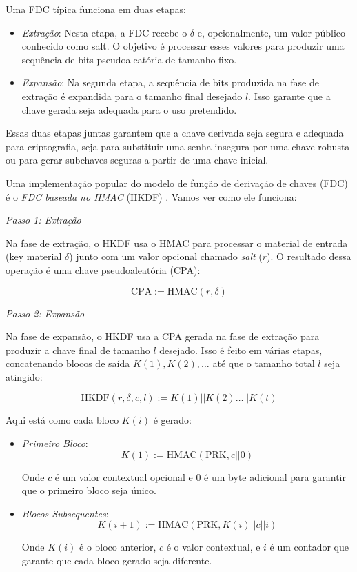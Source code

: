 Uma FDC típica funciona em duas etapas:
\begin{itemize}
\item[] {\em Extração}:
  Nesta etapa, a FDC recebe o $\delta$ e, opcionalmente, um valor público conhecido como salt.
  O objetivo é processar esses valores para produzir uma sequência de bits pseudoaleatória de tamanho fixo.
\item {\em Expansão}:
  Na segunda etapa, a sequência de bits produzida na fase de extração é expandida para o tamanho final desejado $l$.
  Isso garante que a chave gerada seja adequada para o uso pretendido.
\end{itemize}

Essas duas etapas juntas garantem que a chave derivada seja segura e adequada para criptografia, seja para substituir uma senha insegura por uma chave robusta ou para gerar subchaves seguras a partir de uma chave inicial.

Uma implementação popular do modelo de função de derivação de chaves (FDC) é o {\em FDC baseada no HMAC} (HKDF) \cite{Krawczyk10}.
Vamos ver como ele funciona:

{\em Passo 1: Extração}

Na fase de extração, o HKDF usa o HMAC para processar o material de entrada (key material $\delta$) junto com um valor opcional chamado {\em salt} ($r$).
O resultado dessa operação é uma chave pseudoaleatória (CPA):

\begin{displaymath}
\text{CPA} := \text{HMAC}(r, \delta)
\end{displaymath}

{\em Passo 2: Expansão}

Na fase de expansão, o HKDF usa a CPA gerada na fase de extração para produzir a chave final de tamanho $l$ desejado.
Isso é feito em várias etapas, concatenando blocos de saída $K(1), K(2), \dots$ até que o tamanho total $l$ seja atingido:

\begin{displaymath}
\text{HKDF}(r, \delta, c, l) := K(1) || K(2) \dots || K(t)
\end{displaymath}

Aqui está como cada bloco $K(i)$ é gerado:

\begin{itemize}
    \item {\em Primeiro Bloco}:
    \begin{displaymath}
      K(1) := \text{HMAC}(\text{PRK}, c || 0)
    \end{displaymath}

    Onde $c$ é um valor contextual opcional e 0 é um byte adicional para garantir que o primeiro bloco seja único.

    \item {\em Blocos Subsequentes}:
    \begin{displaymath}
    K(i + 1) := \text{HMAC}(\text{PRK}, K(i) || c || i)
    \end{displaymath}
    
    Onde $K(i)$ é o bloco anterior, $c$ é o valor contextual, e $i$ é um contador que garante que cada bloco gerado seja diferente.
\end{itemize}

